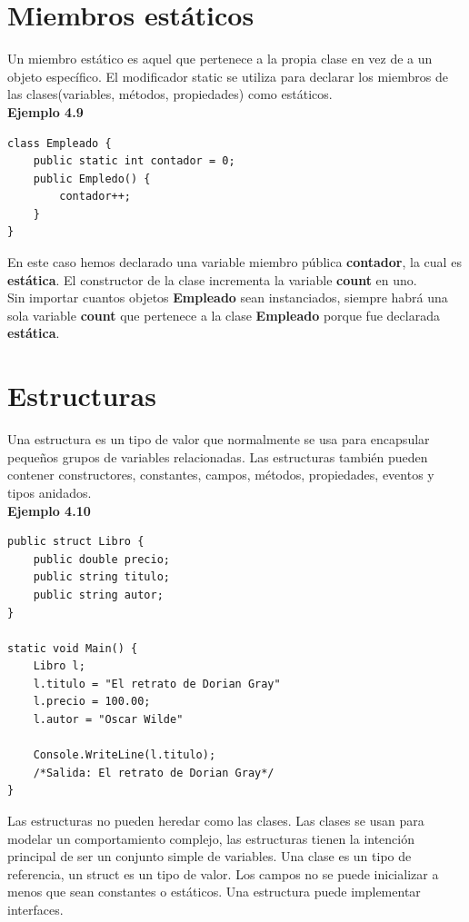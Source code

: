 \documentclass[12pt,a4paper]{report}
\begin{document}
\section{Miembros estáticos}
Un miembro estático es aquel que pertenece a la propia clase en vez de a un objeto específico. El modificador static se utiliza para declarar los miembros de las clases(variables, métodos, propiedades) como estáticos.\\\textbf{Ejemplo 4.9}
\begin{lstlisting}
class Empleado {
	public static int contador = 0;
	public Empledo() {
		contador++;	
	}
}
\end{lstlisting} En este caso hemos declarado una variable miembro pública \textbf{contador}, la cual es \textbf{estática}. El constructor de la clase incrementa la variable \textbf{count} en uno.\\Sin importar cuantos objetos \textbf{Empleado} sean instanciados, siempre habrá una sola variable \textbf{count} que pertenece a la clase \textbf{Empleado} porque fue declarada \textbf{estática}.
\section{Estructuras}
Una estructura es un tipo de valor que normalmente se usa para encapsular pequeños grupos de variables relacionadas. Las estructuras también pueden contener constructores, constantes, campos, métodos, propiedades, eventos y tipos anidados. \\\textbf{Ejemplo 4.10}
\begin{lstlisting}
public struct Libro {
	public double precio;
	public string titulo;
	public string autor;
}

static void Main() {
	Libro l;
	l.titulo = "El retrato de Dorian Gray"
	l.precio = 100.00;
	l.autor = "Oscar Wilde"
	
	Console.WriteLine(l.titulo);
	/*Salida: El retrato de Dorian Gray*/
}
\end{lstlisting} Las estructuras no pueden heredar como las clases. Las clases se usan para modelar un comportamiento complejo, las estructuras tienen la intención principal de ser un conjunto simple de variables. Una clase es un tipo de referencia, un struct es un tipo de valor. Los campos no se puede inicializar a menos que sean constantes o estáticos. Una estructura puede implementar interfaces.
\end{document}
